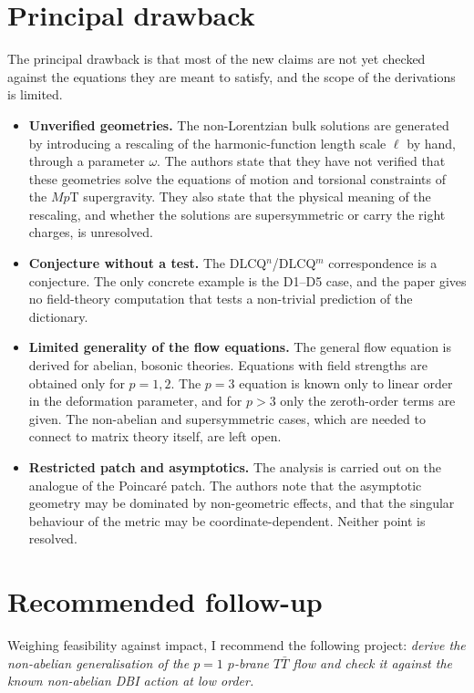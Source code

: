 \documentclass[11pt]{article}
\begin{document}
\section{Principal drawback}

The principal drawback is that most of the new claims are not yet checked against the equations they are meant to satisfy, and the scope of the derivations is limited.

\begin{itemize}
\item \textbf{Unverified geometries.} The non-Lorentzian bulk solutions are generated by introducing a rescaling of the harmonic-function length scale $\ell$ by hand, through a parameter $\omega$. The authors state that they have not verified that these geometries solve the equations of motion and torsional constraints of the $M p$T supergravity. They also state that the physical meaning of the rescaling, and whether the solutions are supersymmetric or carry the right charges, is unresolved.
\item \textbf{Conjecture without a test.} The DLCQ${}^n$/DLCQ${}^m$ correspondence is a conjecture. The only concrete example is the D1--D5 case, and the paper gives no field-theory computation that tests a non-trivial prediction of the dictionary.
\item \textbf{Limited generality of the flow equations.} The general flow equation is derived for abelian, bosonic theories. Equations with field strengths are obtained only for $p=1,2$. The $p=3$ equation is known only to linear order in the deformation parameter, and for $p>3$ only the zeroth-order terms are given. The non-abelian and supersymmetric cases, which are needed to connect to matrix theory itself, are left open.
\item \textbf{Restricted patch and asymptotics.} The analysis is carried out on the analogue of the Poincar\'e patch. The authors note that the asymptotic geometry may be dominated by non-geometric effects, and that the singular behaviour of the metric may be coordinate-dependent. Neither point is resolved.
\end{itemize}

\section{Recommended follow-up}

Weighing feasibility against impact, I recommend the following project: \emph{derive the non-abelian generalisation of the $p=1$ $p$-brane $T\bar T$ flow and check it against the known non-abelian DBI action at low order.}
\end{document}
